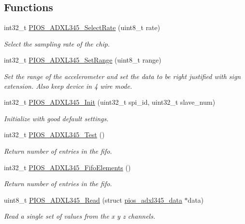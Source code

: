 \subsection*{\-Functions}
\begin{DoxyCompactItemize}
\item 
int32\-\_\-t \hyperlink{group___p_i_o_s___a_d_x_l345_gaedeba8a50a27f4f4419dd30ba5466233}{\-P\-I\-O\-S\-\_\-\-A\-D\-X\-L345\-\_\-\-Select\-Rate} (uint8\-\_\-t rate)
\begin{DoxyCompactList}\small\item\em \-Select the sampling rate of the chip. \end{DoxyCompactList}\item 
int32\-\_\-t \hyperlink{group___p_i_o_s___a_d_x_l345_gad60a361fc357f7a08a7fc5586958e470}{\-P\-I\-O\-S\-\_\-\-A\-D\-X\-L345\-\_\-\-Set\-Range} (uint8\-\_\-t range)
\begin{DoxyCompactList}\small\item\em \-Set the range of the accelerometer and set the data to be right justified with sign extension. \-Also keep device in 4 wire mode. \end{DoxyCompactList}\item 
int32\-\_\-t \hyperlink{group___p_i_o_s___a_d_x_l345_ga1862ab6db103692d9564b3db867f7dd8}{\-P\-I\-O\-S\-\_\-\-A\-D\-X\-L345\-\_\-\-Init} (uint32\-\_\-t spi\-\_\-id, uint32\-\_\-t slave\-\_\-num)
\begin{DoxyCompactList}\small\item\em \-Initialize with good default settings. \end{DoxyCompactList}\item 
int32\-\_\-t \hyperlink{group___p_i_o_s___a_d_x_l345_gae592086eb373986b98f2a5f865736151}{\-P\-I\-O\-S\-\_\-\-A\-D\-X\-L345\-\_\-\-Test} ()
\begin{DoxyCompactList}\small\item\em \-Return number of entries in the fifo. \end{DoxyCompactList}\item 
int32\-\_\-t \hyperlink{group___p_i_o_s___a_d_x_l345_ga9d29094128a0b4a9882fbf034017533b}{\-P\-I\-O\-S\-\_\-\-A\-D\-X\-L345\-\_\-\-Fifo\-Elements} ()
\begin{DoxyCompactList}\small\item\em \-Return number of entries in the fifo. \end{DoxyCompactList}\item 
uint8\-\_\-t \hyperlink{group___p_i_o_s___a_d_x_l345_ga07397b4feb4e0b9dcb4d38f39bd6e432}{\-P\-I\-O\-S\-\_\-\-A\-D\-X\-L345\-\_\-\-Read} (struct \hyperlink{structpios__adxl345__data}{pios\-\_\-adxl345\-\_\-data} $\ast$data)
\begin{DoxyCompactList}\small\item\em \-Read a single set of values from the x y z channels. \end{DoxyCompactList}\end{DoxyCompactItemize}

